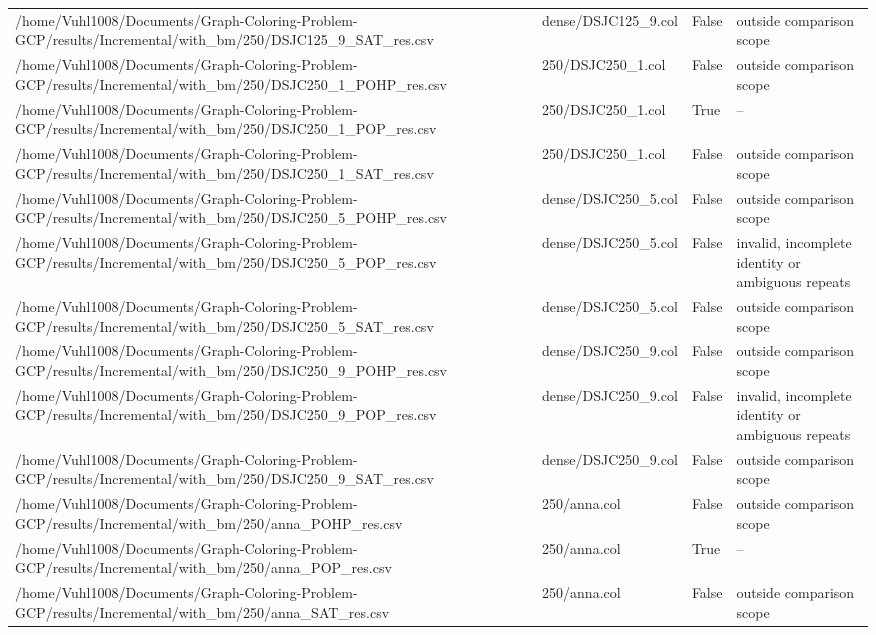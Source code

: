 \begin{table}[htbp]
\begin{tabular}{llll}
/home/Vuhl1008/Documents/Graph-Coloring-Problem-GCP/results/Incremental/with\_bm/250/DSJC125\_9\_SAT\_res.csv & dense/DSJC125\_9.col & False & outside comparison scope \\
/home/Vuhl1008/Documents/Graph-Coloring-Problem-GCP/results/Incremental/with\_bm/250/DSJC250\_1\_POHP\_res.csv & 250/DSJC250\_1.col & False & outside comparison scope \\
/home/Vuhl1008/Documents/Graph-Coloring-Problem-GCP/results/Incremental/with\_bm/250/DSJC250\_1\_POP\_res.csv & 250/DSJC250\_1.col & True & -- \\
/home/Vuhl1008/Documents/Graph-Coloring-Problem-GCP/results/Incremental/with\_bm/250/DSJC250\_1\_SAT\_res.csv & 250/DSJC250\_1.col & False & outside comparison scope \\
/home/Vuhl1008/Documents/Graph-Coloring-Problem-GCP/results/Incremental/with\_bm/250/DSJC250\_5\_POHP\_res.csv & dense/DSJC250\_5.col & False & outside comparison scope \\
/home/Vuhl1008/Documents/Graph-Coloring-Problem-GCP/results/Incremental/with\_bm/250/DSJC250\_5\_POP\_res.csv & dense/DSJC250\_5.col & False & invalid, incomplete identity or ambiguous repeats \\
/home/Vuhl1008/Documents/Graph-Coloring-Problem-GCP/results/Incremental/with\_bm/250/DSJC250\_5\_SAT\_res.csv & dense/DSJC250\_5.col & False & outside comparison scope \\
/home/Vuhl1008/Documents/Graph-Coloring-Problem-GCP/results/Incremental/with\_bm/250/DSJC250\_9\_POHP\_res.csv & dense/DSJC250\_9.col & False & outside comparison scope \\
/home/Vuhl1008/Documents/Graph-Coloring-Problem-GCP/results/Incremental/with\_bm/250/DSJC250\_9\_POP\_res.csv & dense/DSJC250\_9.col & False & invalid, incomplete identity or ambiguous repeats \\
/home/Vuhl1008/Documents/Graph-Coloring-Problem-GCP/results/Incremental/with\_bm/250/DSJC250\_9\_SAT\_res.csv & dense/DSJC250\_9.col & False & outside comparison scope \\
/home/Vuhl1008/Documents/Graph-Coloring-Problem-GCP/results/Incremental/with\_bm/250/anna\_POHP\_res.csv & 250/anna.col & False & outside comparison scope \\
/home/Vuhl1008/Documents/Graph-Coloring-Problem-GCP/results/Incremental/with\_bm/250/anna\_POP\_res.csv & 250/anna.col & True & -- \\
/home/Vuhl1008/Documents/Graph-Coloring-Problem-GCP/results/Incremental/with\_bm/250/anna\_SAT\_res.csv & 250/anna.col & False & outside comparison scope \\

\end{tabular}
\end{table}

